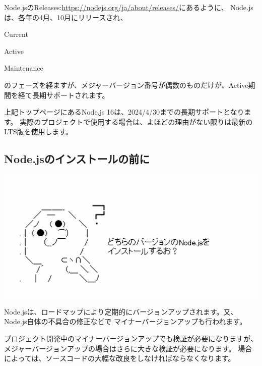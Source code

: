 \clearpage


Node.jsのReleases:\url{https://nodejs.org/ja/about/releases/}にあるように、
Node.jsは、各年の4月、10月にリリースされ、

\begin{starteritemize}
\item Current
\item Active
\item Maintenance
\end{starteritemize}

のフェーズを経ますが、メジャーバージョン番号が偶数のものだけが、Active期間を経て長期サポートされます。

\vspace*{\baselineskip}

上記トップページにあるNode.js 16は、2024/4/30までの長期サポートとなります。
実際のプロジェクトで使用する場合は、よほどの理由がない限りは最新のLTS版を使用します。

\subsection{Node.jsのインストールの前に}
\keeplastskip{
  \label{sec:1-1-2}
  \par\nobreak
}
\begin{reviewimage}%
\includegraphics[width=1.0\maxwidth]{./images/01-createDevEnv/y01_whichNodeVer.png}%
\label{image:01-createDevEnv:y01_whichNodeVer}
\end{reviewimage}

Node.jsは、ロードマップにより定期的にバージョンアップされます。又、Node.js自体の不具合の修正などで
マイナーバージョンアップも行われます。

\vspace*{\baselineskip}

プロジェクト開発中のマイナーバージョンアップでも検証が必要になりますが、
メジャーバージョンアップの場合はさらに大きな検証が必要になります。
場合によっては、ソースコードの大幅な改良をしなければならなくなります。

